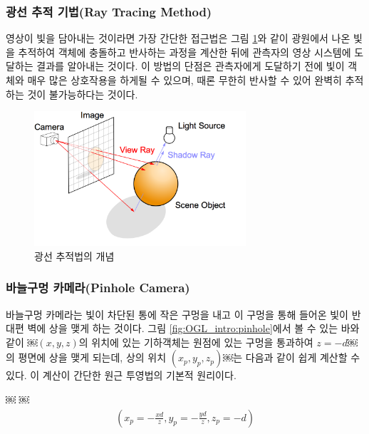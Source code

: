 \subsubsection{광선 추적 기법(Ray Tracing Method)}

영상이 빛을 담아내는 것이라면 가장 간단한 접근법은 그림 \ref{fig:OGL_intro:raytracingConcept}와 같이 광원에서 나온 빛을 추적하여 객체에 충돌하고 반사하는 과정을 계산한 뒤에 관측자의 영상 시스템에 도달하는 결과를 알아내는 것이다. 
이 방법의 단점은 관측자에게 도달하기 전에 빛이 객체와 매우 많은 상호작용을 하게될 수 있으며, 때론 무한히 반사할 수 있어 완벽히 추적하는 것이 불가능하다는 것이다.

\begin{figure}[h!]
  \centering
    \includegraphics[height=5cm]{OGL_intro/raytracingConcept.png}
    \caption{광선 추적법의 개념}
    \label{fig:OGL_intro:raytracingConcept}
\end{figure}

\subsubsection{바늘구멍 카메라(Pinhole Camera)}

바늘구멍 카메라는 빛이 차단된 통에 작은 구멍을 내고 이 구멍을 통해 들어온 빛이 반대편 벽에 상을 맺게 하는 것이다. 그림 \ref{fig:OGL_intro:pinhole}에서 볼 수 있는 바와 같이  ￼$(x,y,z)$의 위치에 있는 기하객체는 원점에 있는 구멍을 통과하여 $z=-d$￼의 평면에 상을 맺게 되는데, 상의 위치 $(x_p, y_p, z_p)$￼는 다음과 같이 쉽게 계산할 수 있다. 이 계산이 간단한 원근 투영법의 기본적 원리이다.

￼
￼
\begin{eqnarray}
\left ( x_p = - \frac{x d}{z} , y_p = - \frac{yd}{z}, z_p = -d \right )
\end{eqnarray}

